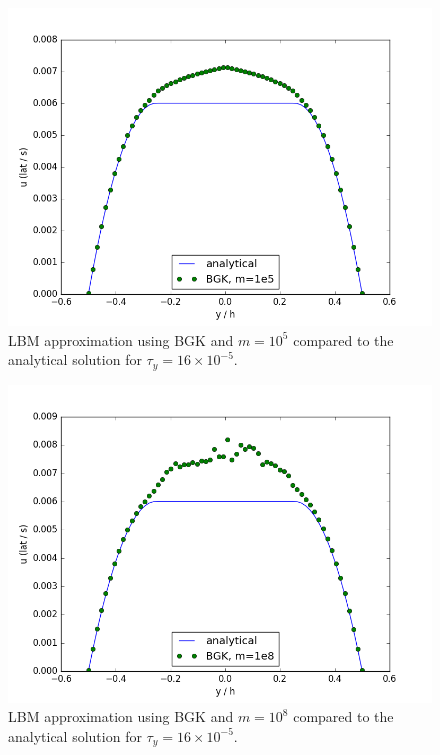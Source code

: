 \documentclass[pdftex,ms]{pittetd}
\begin{document}
\begin{figure}
\centering
\includegraphics[width=\textwidth]{figs/poise-bingham/bgk-5/analytical-vs-approx.png}
\caption{LBM approximation using BGK and $m = 10^5$ compared to the analytical solution for $\tau_y = 16 \times 10^{-5}$.}
\label{fig:bing-analyt-bgk-5}
\end{figure}

\begin{figure}
	\centering
    \includegraphics[width=\textwidth]{figs/poise-bingham/bgk-8/analytical-vs-approx.png}
    \caption{LBM approximation using BGK and $m = 10^8$ compared to the analytical solution for $\tau_y = 16 \times 10^{-5}$.}
\label{fig:bing-analyt-bgk-8}
\end{figure}
\end{document}
